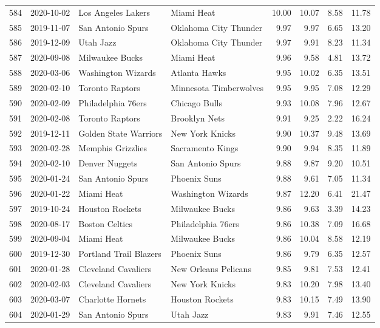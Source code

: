 \documentclass[
  11pt,
]{article}
\theoremstyle{nonumberplain}
\begin{document}
\begin{longtable}{rl|llr|rrr}
584 & 2020-10-02 & Los Angeles Lakers & Miami Heat & 10.00 & 10.07 & 8.58 & 11.78\\
585 & 2019-11-07 & San Antonio Spurs & Oklahoma City Thunder & 9.97 & 9.97 & 6.65 & 13.20\\
586 & 2019-12-09 & Utah Jazz & Oklahoma City Thunder & 9.97 & 9.91 & 8.23 & 11.34\\
587 & 2020-09-08 & Milwaukee Bucks & Miami Heat & 9.96 & 9.58 & 4.81 & 13.72\\
588 & 2020-03-06 & Washington Wizards & Atlanta Hawks & 9.95 & 10.02 & 6.35 & 13.51\\
589 & 2020-02-10 & Toronto Raptors & Minnesota Timberwolves & 9.95 & 9.95 & 7.08 & 12.29\\
590 & 2020-02-09 & Philadelphia 76ers & Chicago Bulls & 9.93 & 10.08 & 7.96 & 12.67\\
591 & 2020-02-08 & Toronto Raptors & Brooklyn Nets & 9.91 & 9.25 & 2.22 & 16.24\\
592 & 2019-12-11 & Golden State Warriors & New York Knicks & 9.90 & 10.37 & 9.48 & 13.69\\
593 & 2020-02-28 & Memphis Grizzlies & Sacramento Kings & 9.90 & 9.94 & 8.35 & 11.89\\
594 & 2020-02-10 & Denver Nuggets & San Antonio Spurs & 9.88 & 9.87 & 9.20 & 10.51\\
595 & 2020-01-24 & San Antonio Spurs & Phoenix Suns & 9.88 & 9.61 & 7.05 & 11.34\\
596 & 2020-01-22 & Miami Heat & Washington Wizards & 9.87 & 12.20 & 6.41 & 21.47\\
597 & 2019-10-24 & Houston Rockets & Milwaukee Bucks & 9.86 & 9.63 & 3.39 & 14.23\\
598 & 2020-08-17 & Boston Celtics & Philadelphia 76ers & 9.86 & 10.38 & 7.09 & 16.68\\
599 & 2020-09-04 & Miami Heat & Milwaukee Bucks & 9.86 & 10.04 & 8.58 & 12.19\\
600 & 2019-12-30 & Portland Trail Blazers & Phoenix Suns & 9.86 & 9.79 & 6.35 & 12.57\\
601 & 2020-01-28 & Cleveland Cavaliers & New Orleans Pelicans & 9.85 & 9.81 & 7.53 & 12.41\\
602 & 2020-02-03 & Cleveland Cavaliers & New York Knicks & 9.83 & 10.20 & 7.98 & 13.40\\
603 & 2020-03-07 & Charlotte Hornets & Houston Rockets & 9.83 & 10.15 & 7.49 & 13.90\\
604 & 2020-01-29 & San Antonio Spurs & Utah Jazz & 9.83 & 9.91 & 7.46 & 12.55\\

\end{longtable}
\end{document}
